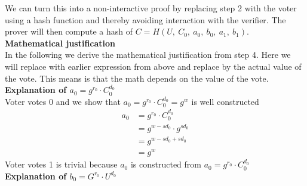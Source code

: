 \noindent
We can turn this into a non-interactive proof by replacing step 2 with the voter using a hash function and thereby avoiding interaction with the verifier. The prover will then compute a hash of \begin{math}C=H(U,\ C_0,\ a_0,\ b_0,\ a_1,\ b_1) \end{math}.\\




\noindent
\textbf{Mathematical justification}\\
In the following we derive the mathematical justification from step 4. Here we will replace with earlier expression from above and replace by the actual value of the vote. This means is that the math depends on the value of the vote.\\

\noindent
\textbf{Explanation of \begin{math}a_0=g^{r_0}  \cdot  C^{d_0}_0\end{math}}\\

\noindent
Voter votes 0 and we show that \begin{math}a_0=g^{r_0}  \cdot  C^{d_0}_0 = g^w \end{math} is well constructed
\begin{align*}
    a_0 &=g^{r_0}  \cdot  C^{d_0}_0     \\ 
        &= g^{w-sd_0} \cdot  g^{sd_0}   \\
        &= g^{w-sd_0+ sd_0}             \\
        &= g^w                          
\end{align*}
Voter votes 1 is trivial because \begin{math}a_0 \end{math}  is constructed from \begin{math}a_0=g^{r_0}  \cdot  C^{d_0}_0 \end{math}\\



\noindent
\textbf{Explanation of \begin{math}b_0 = G^{r_0} \cdot U^{d_0}\end{math}}\\

